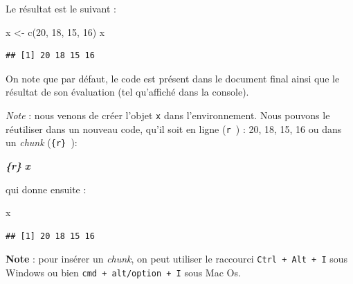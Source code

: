 \documentclass[
  11pt,
]{book}
\newenvironment{Shaded}{\begin{snugshade}}{\end{snugshade}}
\newcommand{\DecValTok}[1]{\textcolor[rgb]{0.00,0.00,0.81}{#1}}
\newcommand{\FunctionTok}[1]{\textcolor[rgb]{0.00,0.00,0.00}{#1}}
\newcommand{\InformationTok}[1]{\textcolor[rgb]{0.56,0.35,0.01}{\textbf{\textit{#1}}}}
\newcommand{\NormalTok}[1]{#1}
\newcommand{\OtherTok}[1]{\textcolor[rgb]{0.56,0.35,0.01}{#1}}
\numberwithin{equation}{section}
\numberwithin{countremarque}{section}
\newenvironment{notebox}{
  \begin{tcolorbox}[breakable, colback=jaune,coltext=black,
                  colframe=grisfonce]}
 {\end{tcolorbox}}
\begin{document}
Le résultat est le suivant :

\begin{Shaded}
\begin{Highlighting}[]
\NormalTok{x }\OtherTok{\textless{}{-}} \FunctionTok{c}\NormalTok{(}\DecValTok{20}\NormalTok{, }\DecValTok{18}\NormalTok{, }\DecValTok{15}\NormalTok{, }\DecValTok{16}\NormalTok{)}
\NormalTok{x}
\end{Highlighting}
\end{Shaded}

\begin{lstlisting}
## [1] 20 18 15 16
\end{lstlisting}

On note que par défaut, le code est présent dans le document final ainsi que le résultat de son évaluation (tel qu'affiché dans la console).

\emph{Note} : nous venons de créer l'objet \texttt{x} dans l'environnement. Nous pouvons le réutiliser dans un nouveau code, qu'il soit en ligne (\texttt{\textasciigrave{}r\ \textasciigrave{}}) : 20, 18, 15, 16 ou dans un \emph{chunk} (\texttt{\textasciigrave{}\textasciigrave{}\textasciigrave{}\{r\}\ \textasciigrave{}\textasciigrave{}\textasciigrave{}}):

\begin{Shaded}
\begin{Highlighting}[]
\InformationTok{\textasciigrave{}\textasciigrave{}\textasciigrave{}\{r\}}
\InformationTok{x}
\InformationTok{\textasciigrave{}\textasciigrave{}\textasciigrave{}}
\end{Highlighting}
\end{Shaded}

qui donne ensuite :

\begin{Shaded}
\begin{Highlighting}[]
\NormalTok{x}
\end{Highlighting}
\end{Shaded}

\begin{lstlisting}
## [1] 20 18 15 16
\end{lstlisting}

\begin{notebox}
\textbf{Note} : pour insérer un \emph{chunk}, on peut utiliser le raccourci \texttt{Ctrl\ +\ Alt\ +\ I} sous Windows ou bien \texttt{cmd\ +\ alt/option\ +\ I} sous Mac Os.

\end{notebox}
\end{document}
